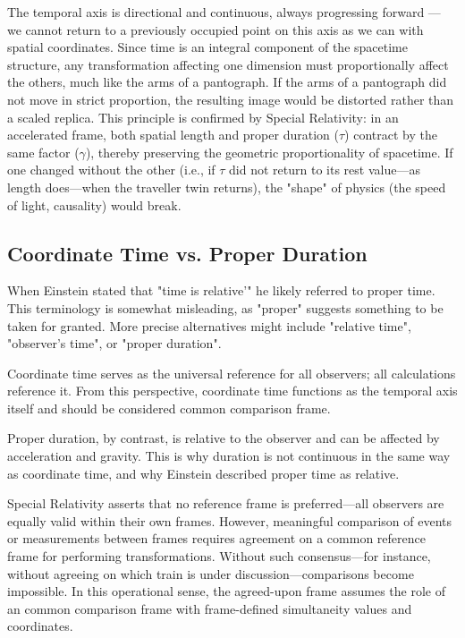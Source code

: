 \documentclass[pdflatex,sn-basic]{sn-jnl}
\theoremstyle{thmstyleone}%
\theoremstyle{thmstyletwo}%
\theoremstyle{thmstylethree}%
\begin{document}
The temporal axis is directional and continuous, always progressing forward — we cannot return to a previously occupied point on this axis as we can with spatial coordinates.
	Since time is an integral component of the spacetime structure, any transformation affecting one dimension must proportionally affect the others, much like the arms of a pantograph. If the arms of a pantograph did not move in strict proportion, the resulting image would be distorted rather than a scaled replica. This principle is confirmed by Special Relativity: in an accelerated frame, both spatial length and proper duration ($\tau$) contract by the same factor ($\gamma$), thereby preserving the geometric proportionality of spacetime. If one changed without the other (i.e., if $\tau$ did not return to its rest value—as length does—when the traveller twin returns), the "shape" of physics (the speed of light, causality) would break.
	\subsection{Coordinate Time vs. Proper Duration}\label{subsec4_3}
	When Einstein stated that "time is relative'" he likely referred to proper time. This terminology is somewhat misleading, as "proper" suggests something to be taken for granted. More precise alternatives might include "relative time", "observer's time", or "proper duration".

	Coordinate time serves as the universal reference for all observers; all calculations reference it. From this perspective, coordinate time functions as the temporal axis itself and should be considered common comparison frame.

	Proper duration, by contrast, is relative to the observer and can be affected by acceleration and gravity. This is why duration is not continuous in the same way as coordinate time, and why Einstein described proper time as relative.
	
	Special Relativity asserts that no reference frame is preferred—all observers are equally valid within their own frames. However, meaningful comparison of events or measurements between frames requires agreement on a common reference frame for performing transformations. Without such consensus—for instance, without agreeing on which train is under discussion—comparisons become impossible. In this operational sense, the agreed-upon frame assumes the role of an common comparison frame with frame-defined simultaneity values and coordinates.
	
\end{document}
